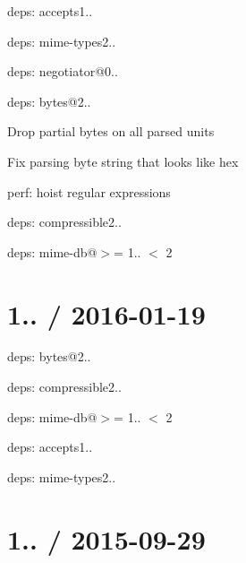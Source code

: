 
\begin{DoxyItemize}
\item deps\+: accepts1..
\begin{DoxyItemize}
\item deps\+: mime-\/types2..
\item deps\+: negotiator@0..
\end{DoxyItemize}
\item deps\+: bytes@2..
\begin{DoxyItemize}
\item Drop partial bytes on all parsed units
\item Fix parsing byte string that looks like hex
\item perf\+: hoist regular expressions
\end{DoxyItemize}
\item deps\+: compressible2..
\begin{DoxyItemize}
\item deps\+: mime-\/db@\textquotesingle{}$>$= 1.. $<$ 2\textquotesingle{}
\end{DoxyItemize}
\end{DoxyItemize}

\section*{1.. / 2016-\/01-\/19 }


\begin{DoxyItemize}
\item deps\+: bytes@2..
\item deps\+: compressible2..
\begin{DoxyItemize}
\item deps\+: mime-\/db@\textquotesingle{}$>$= 1.. $<$ 2\textquotesingle{}
\end{DoxyItemize}
\item deps\+: accepts1..
\begin{DoxyItemize}
\item deps\+: mime-\/types2..
\end{DoxyItemize}
\end{DoxyItemize}

\section*{1.. / 2015-\/09-\/29 }


